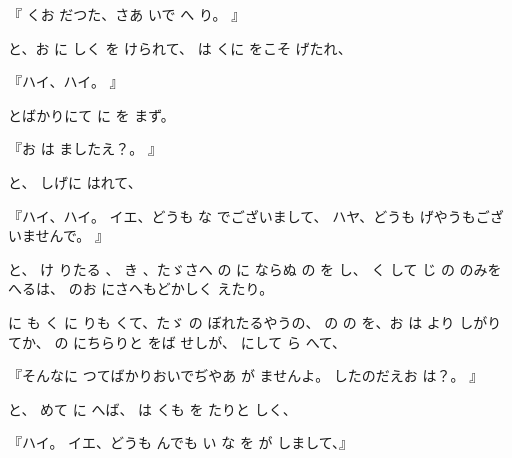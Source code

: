 
『
くお
だつた、さあ
いで
へ
り。
』

と、お
に
しく
を
けられて、
は
くに
をこそ
げたれ、

『ハイ、ハイ。
』

とばかりにて
に
を
まず。

『お
は
ましたえ？。
』

と、
しげに
はれて、

『ハイ、ハイ。
イエ、どうも
な
でございまして、
ハヤ、どうも
げやうもございませんで。
』

と、
け
りたる
、
き
、たゞさへ
の
に
ならぬ
の
を
し、
く
して
じ
の
のみを
へるは、
のお
にさへもどかしく
えたり。

に
も
く
に
りも
くて、たゞ
の
ぼれたるやうの、
の
の
を、お
は
より
しがりてか、
の
にちらりと
をば
せしが、
にして
ら
へて、

『そんなに
つてばかりおいでぢやあ
が
ませんよ。
したのだえお
は？。
』

と、
めて
に
へば、
は
くも
を
たりと
しく、

『ハイ。
イエ、どうも
んでも
い
な
を
が
しまして、』

